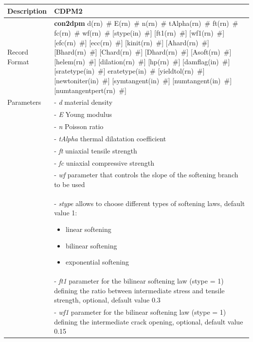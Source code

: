 \documentclass[a4paper]{article}
\newcommand{\descitem}[1]{{\noindent \bf #1}}
\newcommand{\elemparam}[2]{{{#1\tiny (#2)}~\#}}
\newcommand{\param}[1]{{\it #1}}
\newenvironment{mmt}{\begin{tabular}{|l|p{9cm}|}}{\end{tabular}\\}
\newenvironment{mmt}{\begin{tabular}{|l|l|}}{\end{tabular}\\}
\begin{document}
\begin{longtable}{|l|p{9cm}|}
\hline
Description & CDPM2\\
\hline
Record Format & \descitem{con2dpm}  \elemparam{d}{rn} \elemparam{E}{rn} \elemparam{n}{rn} \elemparam{tAlpha}{rn} \elemparam{ft}{rn} \elemparam{fc}{rn} \elemparam{wf}{rn} [\elemparam{stype}{in}] [\elemparam{ft1}{rn}] [\elemparam{wf1}{rn}] [\elemparam{efc}{rn}] [\elemparam{ecc}{rn}] [\elemparam{kinit}{rn}] [\elemparam{Ahard}{rn}] [\elemparam{Bhard}{rn}] [\elemparam{Chard}{rn}] [\elemparam{Dhard}{rn}] [\elemparam{Asoft}{rn}] [\elemparam{helem}{rn}] [\elemparam{dilation}{rn}] [\elemparam{hp}{rn}] [\elemparam{damflag}{in}] [\elemparam{sratetype}{in}] \elemparam{eratetype}{in} [\elemparam{yieldtol}{rn}] [\elemparam{newtoniter}{in}] [\elemparam{symtangent}{in}] [\elemparam{numtangent}{in}] [\elemparam{numtangentpert}{rn}] \\
Parameters &- \param{d} material density\\
&- \param{E} Young modulus\\
&- \param{n} Poisson ratio\\
&- \param{tAlpha} thermal dilatation coefficient\\
&- \param{ft} uniaxial tensile strength\\
&- \param{fc} uniaxial compressive strength\\
&- \param{wf} parameter that controls the slope of the softening branch to be used\\
&- \param{stype} allows to choose different types of softening laws, default value 1:
\begin{itemize}\setlength{\itemsep}{-3pt}
\item[0 -] linear softening 
\item[1 -] bilinear softening
\item[2 -] exponential softening
\end{itemize}\\
&- \param{ft1}  parameter for the bilinear softening law (stype = 1) defining the ratio between intermediate stress and tensile strength, optional, default value 0.3\\
&- \param{wf1}  parameter for the bilinear softening law (stype = 1) defining the intermediate crack opening, optional, default value 0.15\\

\end{longtable}
\end{document}
